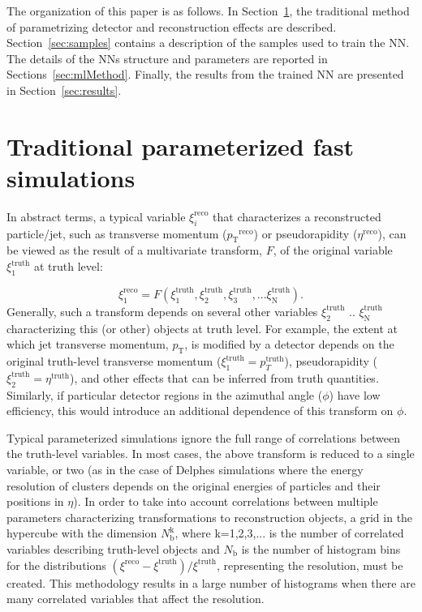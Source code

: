\documentclass[showpacs,showkeys,preprint,prd,nofootinbib,linenumbers,12pt,superscriptaddress]{revtex4-1}
\def\pt{\ensuremath{p_{\mathrm{T}}}}
\def\genRes{\ensuremath{(\xi^{\mathrm{reco}}-\xi^{\mathrm{truth}})/\xi^{\mathrm{truth}}}}
\begin{document}
The organization of this paper is as follows. In Section~\ref{sec:tradMethod}, the traditional method of parametrizing detector and reconstruction effects are described. Section~\ref{sec:samples} contains a description of the samples used to train the NN. The details of the NNs structure and parameters are reported in Sections~\ref{sec:mlMethod}. Finally, the results from the trained NN are presented in Section~\ref{sec:results}.
\FloatBarrier

\section{Traditional parameterized fast simulations}
\label{sec:tradMethod}
In abstract terms, a typical variable $\xi_i^{\mathrm{reco}}$ that characterizes a reconstructed particle/jet, such as transverse momentum (\pt$^{\mathrm{reco}}$) or pseudorapidity ($\eta^{\mathrm{reco}}$), can be viewed as the result of a multivariate transform, $F$, of the original variable $\xi_1^{\mathrm{truth}}$ at truth level:

$$
\xi_1^{\mathrm{reco}} = F (\xi_1^{\mathrm{truth}}, \xi_2^{\mathrm{truth}}, \xi_3^{\mathrm{truth}}, ...\xi_{\mathrm{N}}^{\mathrm{truth}}).
$$
Generally, such a transform  depends on several other variables $\xi_2^{\mathrm{truth}}$ ..  $\xi_{\mathrm{N}}^{\mathrm{truth}}$ characterizing this (or other) objects at truth level. For example, the extent at which jet transverse momentum, \pt, is modified by a detector depends on the original truth-level transverse momentum ($\xi_1^{\mathrm{truth}}=p_T^{\mathrm{truth}}$), pseudorapidity ($\xi_2^{\mathrm{truth}}=\eta^{\mathrm{truth}}$), and other effects that can be inferred from truth quantities. Similarly, if particular detector regions in the azimuthal angle ($\phi$) have low efficiency, this would introduce an additional dependence of this transform on $\phi$.

 Typical parameterized simulations ignore the full range of correlations between the truth-level variables. In most cases, the above transform is reduced to a single variable, or two (as in the case of Delphes simulations where the energy resolution of clusters depends on the original energies of particles and their positions in $\eta$). In order to take into account correlations between multiple parameters characterizing transformations to reconstruction objects, a grid in the hypercube with the dimension $N_{\mathrm{b}}^{\mathrm{k}}$, where k=1,2,3,... is the number of correlated variables describing truth-level objects and $N_{\mathrm{b}}$ is the number of histogram bins for the distributions \genRes, representing the resolution, must be created. This methodology results in a large number of histograms when there are many correlated variables that affect the resolution.
\end{document}
